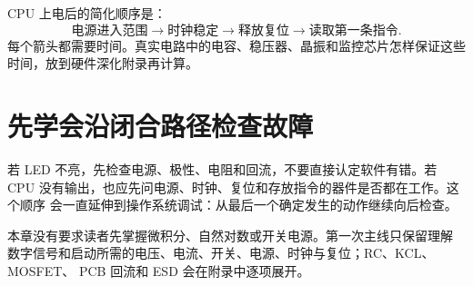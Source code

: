 CPU 上电后的简化顺序是：
\[
  \text{电源进入范围}
  \rightarrow\text{时钟稳定}
  \rightarrow\text{释放复位}
  \rightarrow\text{读取第一条指令}.
\]
每个箭头都需要时间。真实电路中的电容、稳压器、晶振和监控芯片怎样保证这些
时间，放到硬件深化附录再计算。

\section{先学会沿闭合路径检查故障}

若 LED 不亮，先检查电源、极性、电阻和回流，不要直接认定软件有错。若 CPU
没有输出，也应先问电源、时钟、复位和存放指令的器件是否都在工作。这个顺序
会一直延伸到操作系统调试：从最后一个确定发生的动作继续向后检查。

本章没有要求读者先掌握微积分、自然对数或开关电源。第一次主线只保留理解
数字信号和启动所需的电压、电流、开关、电源、时钟与复位；RC、KCL、MOSFET、
PCB 回流和 ESD 会在附录中逐项展开。

